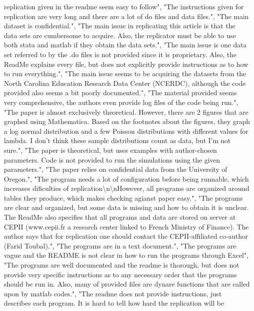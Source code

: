 \documentclass[]{article}
\begin{document}
\begin{itemize}
  replication given in the readme seem easy to follow", "The
  instructions given for replication are very long and there are a lot
  of do files and data files.", "The main dataset is confidential.",
  "The main issue in replicating this article is that the data sets are
  cumbersome to acquire. Also, the replicator must be able to use both
  stata and matlab if they obtain the data sets.", "The main issue is
  one data set referred to by the .do files is not provided since it is
  proprietary. Also, the ReadMe explains every file, but does not
  explicitly provide instructions as to how to run everything.", "The
  main issue seems to be acquiring the datasets from the North Carolina
  Education Research Data Center (NCERDC), although the code provided
  also seems a bit poorly documented.", "The material provided seems
  very comprehensive, the authors even provide log files of the code
  being run.", "The paper is almost exclusively theoretical. However,
  there are 2 figures that are graphed using Mathematica. Based on the
  footnotes about the figures, they graph a log normal distribution and
  a few Poisson distributions with different values for lambda. I don't
  think these sample distributions count as data, but I'm not sure.",
  "The paper is theoretical, but uses examples with author-chosen
  parameters. Code is not provided to run the simulations using the
  given parameters.", "The paper relies on confidential data from the
  University of Oregon.", "The program needs a lot of configuration
  before being runnable, which increases dificulties of
  replication\textbackslash{}n\textbackslash{}nHowever, all programs are
  organized around tables they produce, which makes checking agianst
  paper easy.", "The programs are clear and organized, but some data is
  missing and how to obtain it is unclear. The ReadMe also specifies
  that all programs and data are stored on server at CEPII (www.cepii.fr
  a research center linked to French Ministry of Finance). The author
  says that for replication one should contact the CEPII-affiliated
  co-author (Farid Toubal).", "The programs are in a text document.",
  "The programs are vague and the README is not clear in how to run the
  programs through Excel", "The programs are well documented and the
  readme is thorough, but does not provide very specific instructions as
  to any necessary order that the programs should be run in. Also, many
  of provided files are dynare functions that are called upon by matlab
  codes.", "The readme does not provide instructions, just describes
  each program. It is hard to tell how hard the replication will be

\end{itemize}
\end{document}
